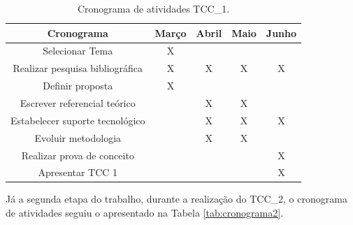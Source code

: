 \begin{table}[H]
	\centering
	\caption{Cronograma de atividades TCC\_1.}
	\label{tab:cronograma1}
	\begin{tabular}{@{}ccccc@{}}
		\toprule
		\textbf{Cronograma}             & \textbf{Março} & \textbf{Abril} & \textbf{Maio} & \textbf{Junho} \\ \midrule
		Selecionar Tema                 & X              &                &               &                \\ \midrule
		Realizar pesquisa bibliográfica & X              & X              & X             & X              \\ \midrule
		Definir proposta                & X              &                &               &                \\ \midrule
		Escrever referencial teórico    &                & X              & X             &                \\ \midrule
		Estabelecer suporte tecnológico &                & X              & X             & X              \\ \midrule
		Evoluir metodologia             &                & X              & X             &                \\ \midrule
		Realizar prova de conceito      &                &                &               & X              \\ \midrule
		Apresentar TCC 1                &                &                &               & X              \\ \bottomrule
	\end{tabular}
\end{table}

Já a segunda etapa do trabalho, durante a realização do TCC\_2, o cronograma de atividades seguiu o apresentado na Tabela \ref{tab:cronograma2}.

